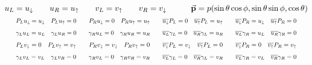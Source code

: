\begin{gather*}
        u_L = u_\downarrow
        \qquad
        u_R = u_\uparrow
        \qquad
        v_L = v_\uparrow
        \qquad
        v_R = v_\downarrow
        \qquad\quad
        \va{p} = p\qty(\sin\theta\cos\phi , \sin\theta\sin\phi , \cos\theta)
        \\
        \resizebox{\linewidth}{!}{$\displaystyle
                P_Lu_\downarrow = u_\downarrow
                \quad
                P_Lu_\uparrow = 0
                \qquad
                P_Ru_\downarrow = 0
                \quad
                P_Ru_\uparrow = u_\uparrow
                \qquad
                \overline{u_\downarrow}P_L = 0
                \quad
                \overline{u_\uparrow}P_L = u_\uparrow
                \qquad
                \overline{u_\downarrow}P_R = u_\downarrow
                \quad
                \overline{u_\uparrow}P_R = 0
        $}
        \\\resizebox{\linewidth}{!}{$\displaystyle
                \gamma_Lu_L = u_L
                \quad
                \gamma_Lu_R = 0
                \qquad
                \gamma_Ru_L = 0
                \quad
                \gamma_Ru_R = u_R
                \qquad
                \overline{u_L}\gamma_L = 0
                \quad
                \overline{u_R}\gamma_L = u_R
                \qquad
                \overline{u_L}\gamma_R = u_L
                \quad
                \overline{u_R}\gamma_R = 0
        $}
        \\\resizebox{\linewidth}{!}{$\displaystyle
                P_Lv_\downarrow = 0
                \quad
                P_Lv_\uparrow = v_\uparrow
                \qquad
                P_Rv_\downarrow = v_\downarrow
                \quad
                P_Rv_\uparrow = 0
                \qquad
                \overline{v_\downarrow}P_L = v_\downarrow
                \quad
                \overline{v_\uparrow}P_L = 0
                \qquad
                \overline{v_\downarrow}P_R = 0
                \quad
                \overline{v_\uparrow}P_R =v_\uparrow
        $}
        \\\resizebox{\linewidth}{!}{$\displaystyle
                \gamma_Lv_L = v_L
                \quad
                \gamma_Lv_R = 0
                \qquad
                \gamma_Rv_L = 0
                \quad
                \gamma_Rv_R = v_R
                \qquad
                \overline{v_L}\gamma_L = 0
                \quad
                \overline{v_R}\gamma_L = v_R
                \qquad
                \overline{v_L}\gamma_R = v_L
                \quad
                \overline{v_R}\gamma_R = 0
        $}
\end{gather*}

